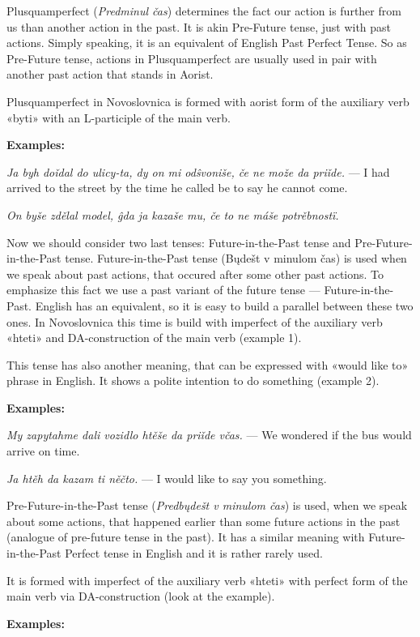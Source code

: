 Plusquamperfect (\textit{Predminul čas}) determines the fact our action is further from us than another action in the past. It is akin Pre-Future tense, just with past actions. Simply speaking, it is an equivalent of English Past Perfect Tense. So as Pre-Future tense, actions in Plusquamperfect are usually used in pair with another past action that stands in Aorist.

Plusquamperfect in Novoslovnica is formed with aorist form of the auxiliary verb «byti» with an L-participle of the main verb.

\textbf{Examples:}

\textit{Ja byh doǐdal do ulicy-ta, dy on mi odŝvoniše, če ne može da priǐde.} — I had arrived to the street by the time he called be to say he cannot come.

\textit{On byše zdělal model, ĝda ja kazaše mu, če to ne máše potrěbnostï.}

Now we should consider two last tenses: Future-in-the-Past tense and Pre-Future-in-the-Past tense.
Future-in-the-Past tense (Bųdešt v minulom čas) is used when we speak about past actions, that occured after some other past actions. To emphasize this fact we use a past variant of the future tense — Future-in-the-Past. English has an equivalent, so it is easy to build a parallel between these two ones. In Novoslovnica this time is build with imperfect of the auxiliary verb «hteti» and DA-construction of the main verb (example 1).

This tense has also another meaning, that can be expressed with «would like to» phrase in English. It shows a polite intention to do something (example 2).

\textbf{Examples:}

\textit{My zapytahme dali vozidlo htěše da priǐde včas.} — We wondered if the bus would arrive on time.

\textit{Ja htěh da kazam ti něčto.} — I would like to say you something.

Pre-Future-in-the-Past tense (\textit{Predbųdešt v minulom čas}) is used, when we speak about some actions, that happened earlier than some future actions in the past (analogue of pre-future tense in the past). It has a similar meaning with Future-in-the-Past Perfect tense in English and it is rather rarely used.

It is formed with imperfect of the auxiliary verb «hteti» with perfect form of the main verb via DA-construction (look at the example).

\textbf{Examples:}

